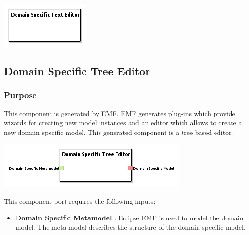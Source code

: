 \documentclass{gemoc} %
\begin{document}
\begin{center}
\includegraphics*[trim=0.0cm 0.0cm 0cm 0.0cm, clip=true]{../images/generated/Generated_Domain_Specific_Text_Editor.png}
\end{center}




\subsection{Domain Specific Tree Editor}


\subsubsection{Purpose}
This component is generated by EMF. EMF generates plug-ins which provide wizards for creating new model instances and an editor which allows to create a new domain specific model. This generated component is a tree based editor.

\begin{center}
\includegraphics*[trim=0.0cm 0.0cm 0cm 0.0cm, clip=true]{../images/generated/Generated_Domain_Specific_Tree_Editor.png}
\end{center}

This component port requires the following inputs:
\begin{itemize}
  \item \textbf{Domain Specific Metamodel} :
Eclipse EMF is used to model the domain model. The meta-model describes the structure of the domain specific model.
\end{itemize}
\end{document}
